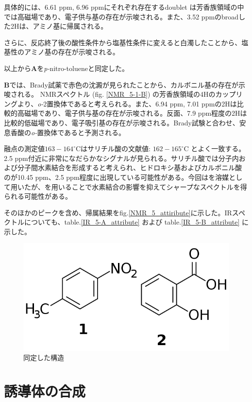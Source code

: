 \documentclass{ltjsarticle}
\theoremstyle{definition}
\numberwithin{equation}{section}
\newcommand{\D}{^\circ\text{C}}
\begin{document}
具体的には、6.61 ppm, 6.96 ppmにそれぞれ存在するdoublet は芳香族領域の中では高磁場であり、電子供与基の存在が示唆される。また、3.52 ppmのbroadした2Hは、アミノ基に帰属される。

さらに、反応終了後の酸性条件から塩基性条件に変えると白濁したことから、塩基性のアミノ基の存在が示唆される。

以上から\textbf{A}を\textit{p-}nitro-tolueneと同定した。

\textbf{B}では、Brady試薬で赤色の沈澱が見られたことから、カルボニル基の存在が示唆される。 NMRスペクトル (fig. \ref{NMR_5-1-B}) の芳香族領域の4Hのカップリングより、\textit{o-}2置換体であると考えられる。また、6.94 ppm, 7.01 ppmの2Hは比較的高磁場であり、電子供与基の存在が示唆される。反面、7.9 ppm程度の2Hは比較的低磁場であり、電子吸引基の存在が示唆される。Brady試験と合わせ、安息香酸の\textit{o-}置換体であると予測される。

融点の測定値$163-164\D$はサリチル酸の文献値: $162-165\D$ とよく一致する。
2.5 ppm付近に非常になだらかなシグナルが見られる。サリチル酸では分子内および分子間水素結合を形成すると考えられ、ヒドロキシ基およびカルボニル酸のが10.45 ppm、2.5 ppm程度に出現している可能性がある。今回はを溶媒として用いたが、を用いることで水素結合の影響を抑えてシャープなスペクトルを得られる可能性がある\cite{Abrahum}。

そのほかのピークを含め、帰属結果をfig.\ref{NMR_5_attiribute}に示した。IRスペクトルについても、table.\ref{IR_5-A_attribute} および table.\ref{IR_5-B_attribute} に示した。
\begin{figure}[htbp]
\begin{center}
\includegraphics[width = 8 cm]{structure5-1.png}
\caption{同定した構造}
\label{structure}
\end{center}
\end{figure}

\section{誘導体の合成}
\end{document}
